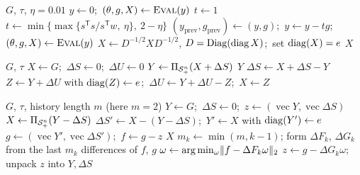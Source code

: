 \begin{algorithm}[H]
\caption{SBB-Dual (clamped spectral gradient on the dual)}\label{alg:sbb}
\begin{algorithmic}[1]
\Require $G$, $\tau$, $\eta=0.01$
\State $y\gets0$;\ $(\theta,g,X)\gets\textsc{Eval}(y)$
    \State $t\gets1$
  \Else
    \State $t\gets\min\{\max\{s^{\mathsf T}s/s^{\mathsf T}w,\ \eta\},\ 2-\eta\}$ 
  \EndIf
  \State $(y_{\mathrm{prev}},g_{\mathrm{prev}})\gets(y,g)$;\ $y\gets y-tg$;\ $(\theta,g,X)\gets\textsc{Eval}(y)$
\EndWhile
\State $X\gets D^{-1/2}XD^{-1/2}$, $D=\operatorname{Diag}(\operatorname{diag} X)$;\ set $\operatorname{diag}(X)=e$ 
\State \Return $X$
\end{algorithmic}
\end{algorithm}

\begin{algorithm}[H]
\caption{Dykstra-APM (alternating projections with Dykstra correction)}\label{alg:apm}
\begin{algorithmic}[1]
\Require $G$, $\tau$
\State $X\gets G$;\ $\Delta S\gets0$;\ $\Delta U\gets0$
\Loop
  \State $Y\gets\Pi_{\mathcal{S}_+^n}(X+\Delta S)$ 
   \Return $Y$ 
  \EndIf
  \State $\Delta S\gets X+\Delta S-Y$
  \State $Z\gets Y+\Delta U$ with $\operatorname{diag}(Z)\gets e$;\ $\Delta U\gets Y+\Delta U-Z$;\ $X\gets Z$
\EndLoop
\end{algorithmic}
\end{algorithm}

\begin{algorithm}[H]
\caption{Anderson-APM (alternating projections with Anderson acceleration,
history $m$; Higham and Strabi\'{c}~\cite{higham2016anderson})}\label{alg:anderson}
\begin{algorithmic}[1]
\Require $G$, $\tau$, history length $m$ (here $m=2$)
\State $Y\gets G$;\ $\Delta S\gets0$;\ $z\gets(\operatorname{vec}Y,\operatorname{vec}\Delta S)$
  \State $X\gets\Pi_{\mathcal{S}_+^n}(Y-\Delta S)$ 
  \State $\Delta S'\gets X-(Y-\Delta S)$;\ $Y'\gets X$ with $\operatorname{diag}(Y')\gets e$
  \State $g\gets(\operatorname{vec}Y',\operatorname{vec}\Delta S')$;\ $f\gets g-z$
   \Return $X$ 
  \EndIf
  \State $m_k\gets\min(m,k-1)$; form $\Delta F_k$, $\Delta G_k$ from the last $m_k$ differences of $f$, $g$
  \State $\omega\gets\arg\min_\omega\lVert f-\Delta F_k\omega\rVert_2$ 
  \State $z\gets g-\Delta G_k\omega$; unpack $z$ into $Y,\Delta S$
\EndFor
\end{algorithmic}
\end{algorithm}
